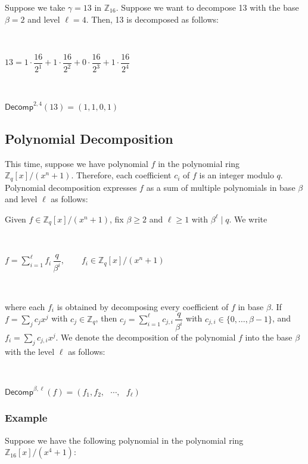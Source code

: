Suppose we take $\gamma=13$ in $\mathbb{Z}_{16}$. Suppose we want to decompose 13 with the base $\beta = 2$ and level $\ell = 4$. Then, 13 is decomposed as follows:

$ $

$13 = 1 \cdot \dfrac{16}{2^1} + 1 \cdot \dfrac{16}{2^2} + 0 \cdot \dfrac{16}{2^3} + 1 \cdot \dfrac{16}{2^4}$

$ $

$\textsf{Decomp}^{2, 4}(13) = (1, 1, 0, 1)$


\subsection{Polynomial Decomposition}
\label{subsec:poly-decomp}

This time, suppose we have polynomial $f$ in the polynomial ring ${\mathbb{Z}_q[x] / (x^n + 1)}$. Therefore, each coefficient $c_i$ of $f$ is an integer modulo $q$. Polynomial decomposition expresses $f$ as a sum of multiple polynomials in base $\beta$ and level $\ell$ as follows:


\begin{tcolorbox}[title={\textbf{\tboxlabel{\ref*{subsec:poly-decomp}} Polynomial Decomposition}}]

Given $f\in \mathbb{Z}_q[x]/(x^n+1)$, fix $\beta\ge 2$ and $\ell\ge 1$ with $\beta^\ell\mid q$. We write

$ $

$
f=\sum\limits_{i=1}^{\ell} f_i\,\dfrac{q}{\beta^i}, \qquad f_i\in \mathbb{Z}_q[x]/(x^n+1)
$

$ $

where each $f_i$ is obtained by decomposing every coefficient of $f$ in base $\beta$. If $f=\sum\limits_j c_j x^j$ with $c_j\in\mathbb{Z}_q$, then
$c_j=\sum\limits_{i=1}^{\ell} c_{j,i}\,\dfrac{q}{\beta^i}$ with $c_{j,i}\in\{0,\ldots,\beta-1\}$,
and $f_i=\sum_j c_{j,i} x^j$.
We denote the decomposition of the polynomial $f$ into the base $\beta$ with the level $\ell$ as follows:

$ $

$\textsf{Decomp}^{\beta, \ell}(f) = (f_1, f_2, \text{ } \cdots , \text{ } f_\ell)$
 $ $
\end{tcolorbox}




\subsubsection{Example}

Suppose we have the following polynomial in the polynomial ring $\mathbb{Z}_{16}[x] / (x^4 + 1)$:

